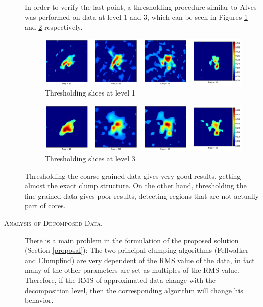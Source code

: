 \documentclass[letter, 11pt]{article}
\begin{document}
\begin{description}
    In order to verify the last point, a thresholding procedure similar to Alves \cite{Alves} was performed on data at level $1$ and $3$, which can be seen in Figures \ref{fig:th1} and \ref{fig:th3} respectively.
    \begin{figure}[htpb!]
    \centering
    \includegraphics[width=14cm]{threshold1}
    \caption{Thresholding slices at level 1}
    \label{fig:th1}
    \end{figure}

    \begin{figure}[htpb!]
    \centering
    \includegraphics[width=14cm]{threshold2}
    \caption{Thresholding slices at level 3}
    \label{fig:th3}
    \end{figure}
    Thresholding the coarse-grained data gives very good results, getting almost the exact clump structure. On the other hand, thresholding the fine-grained data gives poor results, detecting regions that are not actually part of cores.


    \item[\textsc{Analysis of Decomposed Data.}]
    There is a main problem in the formulation of the proposed solution (Section \ref{proposal}): The two principal clumping algorithms (Fellwalker and Clumpfind) are very dependent of the RMS value of the data, in fact many of the other parameters are set as multiples of the RMS value. Therefore, if the RMS of approximated data change with the decomposition level, then the corresponding algorithm will change his behavior.


\end{description}
\end{document}

